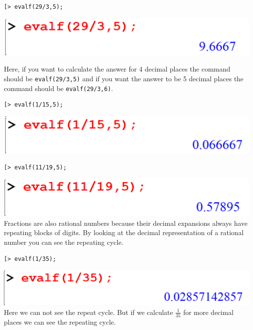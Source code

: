 \documentclass[
]{book}
\theoremstyle{definition}
\theoremstyle{definition}
\theoremstyle{definition}
\theoremstyle{definition}
\theoremstyle{remark}
\begin{document}
\begin{verbatim}
[> evalf(29/3,5);
\end{verbatim}

\includegraphics{figures/Lesson 1/fig37.png}

Here, if you want to calculate the answer for 4 decimal places the command should be \texttt{evalf(29/3,5)} and if you want the answer to be 5 decimal places the command should be \texttt{evalf(29/3,6)}.

\begin{verbatim}
[> evalf(1/15,5);
\end{verbatim}

\includegraphics{figures/Lesson 1/fig38.png}

\begin{verbatim}
[> evalf(11/19,5);
\end{verbatim}

\includegraphics{figures/Lesson 1/fig39.png}
Fractions are also rational numbers because their decimal expansions always have repeating blocks of digits. By looking at the decimal representation of a rational number you can see the repeating cycle.

\begin{verbatim}
[> evalf(1/35);
\end{verbatim}

\includegraphics{figures/Lesson 1/fig40.png}
Here we can not see the repeat cycle. But if we calculate \(\frac{1}{35}\) for more decimal places we can see the repeating cycle.
\end{document}
